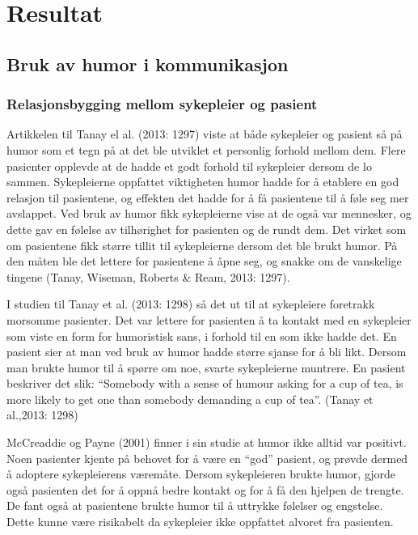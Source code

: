\chapter{Resultat}

\section{Bruk av humor i kommunikasjon}

\subsection{Relasjonsbygging mellom sykepleier og pasient}

Artikkelen til Tanay el al. (2013: 1297) viste at både sykepleier og pasient så
på humor som et tegn på at det ble utviklet et personlig forhold mellom dem.
Flere pasienter opplevde at de hadde et godt forhold til sykepleier dersom de
lo sammen. Sykepleierne oppfattet viktigheten humor hadde for å etablere en god
relasjon til pasientene, og effekten det hadde for å få pasientene til å føle
seg mer avslappet. Ved bruk av humor fikk sykepleierne vise at de også var
mennesker, og dette gav en følelse av tilhørighet for pasienten og de rundt
dem. Det virket som om pasientene fikk større tillit til sykepleierne dersom
det ble brukt humor. På den måten ble det lettere for pasientene å åpne seg, og
snakke om de vanskelige tingene (Tanay, Wiseman, Roberts \&{} Ream, 2013: 1297).

I studien til Tanay et al. (2013: 1298) så det ut til at sykepleiere foretrakk
morsomme pasienter. Det var lettere for pasienten å ta kontakt med en
sykepleier som viste en form for humoristisk sans, i forhold til en som ikke
hadde det. En pasient sier at man ved bruk av humor hadde større sjanse for å
bli likt. Dersom man brukte humor til å spørre om noe, svarte sykepleierne
muntrere. En pasient beskriver det slik: “Somebody with a sense of humour
asking for a cup of tea, is more likely to get one than somebody demanding a
cup of tea”. (Tanay et al.,2013: 1298)

McCreaddie og Payne (2001) finner i sin studie at humor ikke alltid var
positivt. Noen pasienter kjente på behovet for å være en “god” pasient, og
prøvde dermed å adoptere sykepleierens væremåte. Dersom sykepleieren brukte
humor, gjorde også pasienten det for å oppnå bedre kontakt og for å få den
hjelpen de trengte. De fant også at pasientene brukte humor til å uttrykke
følelser og engstelse. Dette kunne være risikabelt da sykepleier ikke oppfattet
alvoret fra pasienten.

